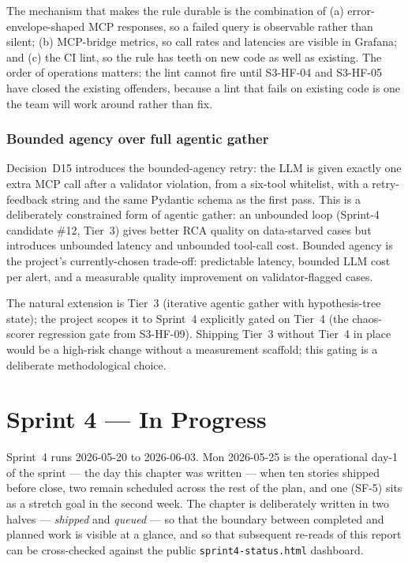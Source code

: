 \documentclass[11pt,a4paper,oneside]{report}
\begin{document}
The mechanism that makes the rule durable is the combination of
(a) error-envelope-shaped MCP responses, so a failed query is
observable rather than silent; (b) MCP-bridge metrics, so call rates
and latencies are visible in Grafana; and (c) the CI lint, so the
rule has teeth on new code as well as existing.  The order of
operations matters: the lint cannot fire until S3-HF-04 and S3-HF-05
have closed the existing offenders, because a lint that fails on
existing code is one the team will work around rather than fix.

\subsection{Bounded agency over full agentic gather}

Decision~D15 introduces the bounded-agency retry: the LLM is given
exactly one extra MCP call after a validator violation, from a
six-tool whitelist, with a retry-feedback string and the same
Pydantic schema as the first pass.  This is a deliberately constrained
form of agentic gather: an unbounded loop (Sprint-4 candidate \#12,
Tier~3) gives better RCA quality on data-starved cases but introduces
unbounded latency and unbounded tool-call cost.  Bounded agency is
the project's currently-chosen trade-off: predictable latency, bounded
LLM cost per alert, and a measurable quality improvement on
validator-flagged cases.

The natural extension is Tier~3 (iterative agentic gather with
hypothesis-tree state); the project scopes it to Sprint~4 explicitly
gated on Tier~4 (the chaos-scorer regression gate from S3-HF-09).
Shipping Tier~3 without Tier~4 in place would be a high-risk change
without a measurement scaffold; this gating is a deliberate
methodological choice.

\chapter{Sprint 4 --- In Progress}
\label{ch:sprint4}

Sprint~4 runs 2026-05-20 to 2026-06-03.  Mon 2026-05-25 is the
operational day-1 of the sprint --- the day this chapter was
written --- when ten stories shipped before close, two remain
scheduled across the rest of the plan, and one (SF-5) sits as a
stretch goal in the second week.  The
chapter is deliberately written in two halves --- \emph{shipped}
and \emph{queued} --- so that the boundary between completed and
planned work is visible at a glance, and so that subsequent
re-reads of this report can be cross-checked against the public
\texttt{sprint4-status.html} dashboard.
\end{document}
